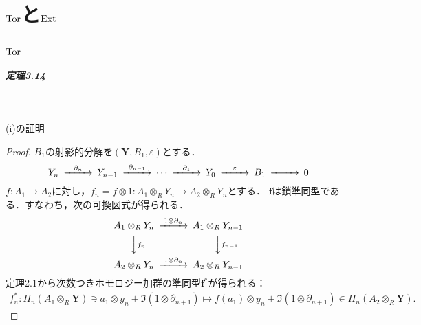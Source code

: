 \chapter{$\operatorname{Tor}$と$\operatorname{Ext}$}
\setcounter{section}{1}
\section{$\operatorname{Tor}$}
\paragraph{定理3.14}~
\begin{screen}
  (i)の証明
\end{screen}
\begin{proof}
  $B_1$の射影的分解を$(\boldsymbol{Y}, B_1, \varepsilon)$とする．
  \[
  \begin{CD}
    Y_n @>{\partial_n}>> Y_{n-1} @>{\partial_{n-1}}>> \cdots @>{\partial_1}>> Y_0 @>{\varepsilon}>> B_1 @>>> 0
  \end{CD}
  \]
  $f \colon A_1 \to A_2$に対し，$f_n = f \otimes 1 \colon A_1 \otimes_R Y_n \to A_2 \otimes_R Y_n$とする．
  $\boldsymbol{f}$は鎖準同型である．すなわち，次の可換図式が得られる．
  \[
  \begin{CD}
    A_1 \otimes_R Y_n @>{1 \otimes \partial_n}>> A_1 \otimes_R Y_{n-1} \\
    @VV{f_n}V @VV{f_{n-1}}V \\
    A_2 \otimes_R Y_n @>{1 \otimes \partial_n}>> A_2 \otimes_R Y_{n-1}
  \end{CD}
  \]
  定理2.1から次数つきホモロジー加群の準同型$\boldsymbol{f}^\ast$が得られる：
  \begin{align}
    f_n^{\ast} \colon H_n(A_1 \otimes_R \boldsymbol{Y}) \ni a_1 \otimes y_n + \Im (1 \otimes \partial_{n+1}) \mapsto f(a_1) \otimes y_n + \Im (1 \otimes \partial_{n+1}) \in H_n(A_2 \otimes_R \boldsymbol{Y}). \label{thm_3_14_eq_1}
  \end{align}


\end{proof}

